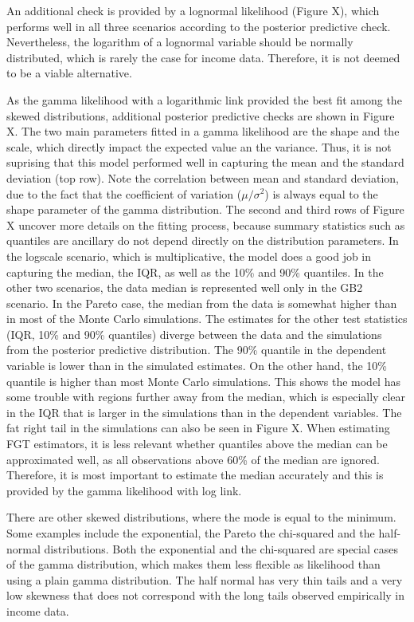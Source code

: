 An additional check is provided by a lognormal likelihood (Figure X), which performs well in all three scenarios according to the posterior predictive check.
Nevertheless, the logarithm of a lognormal variable should be normally distributed, which is rarely the case for income data.
Therefore, it is not deemed to be a viable alternative.


As the gamma likelihood with a logarithmic link provided the best fit among the skewed distributions, additional posterior predictive checks are shown in Figure X.
The two main parameters fitted in a gamma likelihood are the shape and the scale, which directly impact the expected value an the variance.
Thus, it is not suprising that this model performed well in capturing the mean and the standard deviation (top row).
Note the correlation between mean and standard deviation, due to the fact that the coefficient of variation ($\mu / \sigma^2$) is always equal to the shape parameter of the gamma distribution.
The second and third rows of Figure X uncover more details on the fitting process, because summary statistics such as quantiles are ancillary do not depend directly on the distribution parameters.
In the logscale scenario, which is multiplicative, the model does a good job in capturing the median, the IQR, as well as the 10\% and 90\% quantiles.
In the other two scenarios, the data median is represented well only in the GB2 scenario.
In the Pareto case, the median from the data is somewhat higher than in most of the Monte Carlo simulations.
The estimates for the other test statistics (IQR, 10\% and 90\% quantiles) diverge between the data and the simulations from the posterior predictive distribution.
The 90\% quantile in the dependent variable is lower than in the simulated estimates.
On the other hand, the 10\% quantile is higher than most Monte Carlo simulations.
This shows the model has some trouble with regions further away from the median, which is especially clear in the IQR that is larger in the simulations than in the dependent variables.
The fat right tail in the simulations can also be seen in Figure X.
When estimating FGT estimators, it is less relevant whether quantiles above the median can be approximated well, as all observations above 60\% of the median are ignored.
Therefore, it is most important to estimate the median accurately and this is provided by the gamma likelihood with log link.

There are other skewed distributions, where the mode is equal to the minimum.
Some examples include the exponential, the Pareto the chi-squared and the half-normal distributions.
Both the exponential and the chi-squared are special cases of the gamma distribution, which makes them less flexible as likelihood than using a plain gamma distribution.
The half normal has very thin tails and a very low skewness that does not correspond with the long tails observed empirically in income data.

